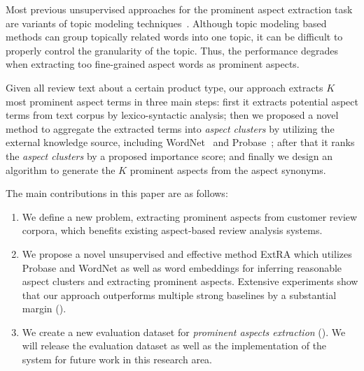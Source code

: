 Most previous unsupervised approaches for the prominent 
aspect extraction task are variants of topic modeling 
techniques~\cite{lakkaraju2011exploiting,lin2009joint,wang2011latent}.
Although topic modeling based methods can group 
topically related words into one topic,
it can be difficult to properly control the granularity of the topic.
Thus, the performance degrades when extracting too fine-grained aspect words
as prominent aspects.

Given all review text about a certain product type,
our approach
extracts $K$ most prominent aspect terms in three main steps: 
first it extracts potential aspect terms from text corpus by lexico-syntactic analysis; 
then we proposed a novel method to aggregate the extracted terms 
into \emph{aspect clusters} by utilizing the external knowledge source,
including WordNet~\cite{miller1995wordnet} and Probase~\cite{wu2012probase}; 
after that it ranks the \emph{aspect clusters} by a proposed importance score; 
and finally we design an algorithm to generate the $K$ prominent
aspects from the aspect synonyms.
  
The main contributions in this paper are as follows:
\begin{enumerate}
	\item We define a new problem, extracting prominent aspects from customer review corpora, which benefits existing aspect-based review analysis systems.
	
	\item We propose a novel unsupervised and effective method ExtRA which utilizes Probase and WordNet as well as word embeddings
	 for inferring reasonable aspect clusters 
	and extracting prominent aspects.
	Extensive experiments show that our approach outperforms 
	multiple strong baselines by a substantial
	margin (). 
	
    \item We create a new evaluation dataset for 
    \emph{prominent aspects extraction} (). 
    We will release the evaluation dataset as well as the implementation of the system for future work in this research area.
\end{enumerate}

